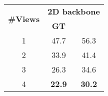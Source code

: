 

\begin{tabular}{|c|c|c|}
\hline
\multirow{2}{*}{\textbf{\#Views}} & \multicolumn{2}{c|}{\textbf{2D backbone}} \\ \cline{2-3} 
 & \rule{0pt}{2ex}\textbf{GT } & \textbf{\cite{iskakov2019learnable}}\\
\hline
1 & 47.7 & 56.3 \\
\hline
2 & 33.9 & 41.4\\
\hline
3 & 26.3 & 34.6 \\
\hline
4 & \textbf{22.9} & \textbf{30.2} \\
\hline
\end{tabular}

